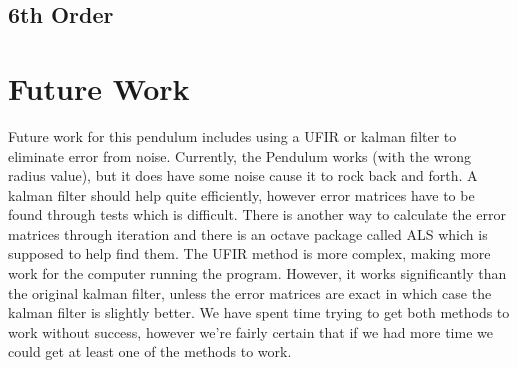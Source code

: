 \documentclass{article}
\begin{document}
\subsection{6th Order}

\section{Future Work}
Future work for this pendulum includes using a UFIR or kalman filter to eliminate error from noise. Currently, the Pendulum works (with the wrong radius value), but it does have some noise cause it to rock back and forth. A kalman filter should help quite efficiently, however error matrices have to be found through tests which is difficult. There is another way to calculate the error matrices through iteration and there is an octave package called ALS which is supposed to help find them. The UFIR method is more complex, making more work for the computer running the program. However, it works significantly than the original kalman filter, unless the error matrices are exact in which case the kalman filter is slightly better. We have spent time trying to get both methods to work without success, however we're fairly certain that if we had more time we could get at least one of the methods to work.
\end{document}

